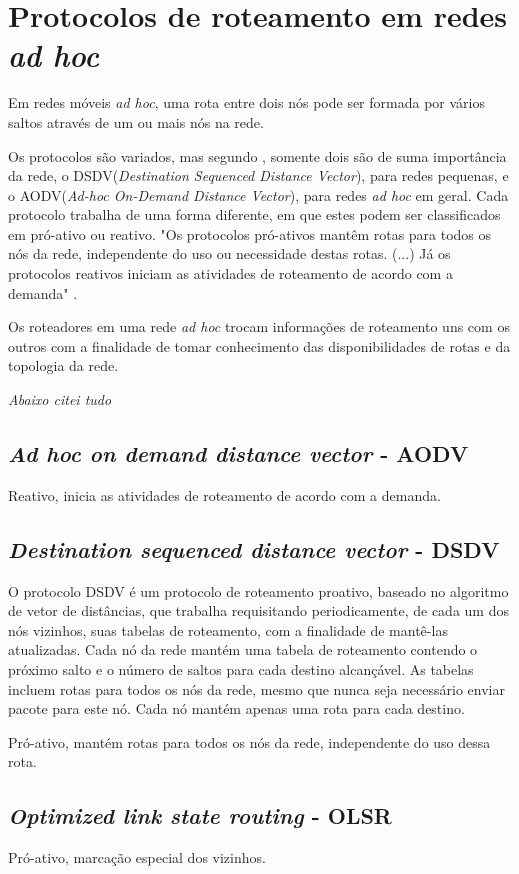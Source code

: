 \section{Protocolos de roteamento em redes \textit{ad hoc}}
Em redes m\'oveis \textit{ad hoc}, uma rota entre dois n\'os pode ser formada por v\'arios saltos atrav\'es de um ou mais n\'os na rede. 

Os protocolos s\~ao variados, mas segundo \cite{gorantala}, somente dois s\~ao de suma import\^ancia da rede, o DSDV(\textit{Destination Sequenced Distance Vector}), para redes pequenas, e o AODV(\textit{Ad-hoc On-Demand Distance Vector}), para redes \textit{ad hoc} em geral. Cada protocolo trabalha de uma forma diferente, em que estes podem ser classificados em pr\'o-ativo ou reativo. "Os protocolos pr\'o-ativos mant\^em rotas para todos os n\'os da rede, independente do uso ou necessidade destas rotas. (...) J\'a os protocolos reativos iniciam as atividades de roteamento de acordo com a demanda" \cite{pereira}.

Os roteadores em uma rede \textit{ad hoc} trocam informa\c{c}\~oes de roteamento uns com os outros com a finalidade de tomar conhecimento das disponibilidades de rotas e da topologia da rede.\cite{pereira}

\textit{Abaixo citei tudo \cite{gorantala}}

\subsection{\textit{Ad hoc on demand distance vector} - AODV}
Reativo, inicia as atividades de roteamento de acordo com a demanda.

\subsection{\textit{Destination sequenced distance vector} - DSDV}
O protocolo DSDV \'e um protocolo de roteamento proativo\cite{gorantala}, baseado no algoritmo de vetor de dist\^ancias, que trabalha requisitando periodicamente, de cada um dos n\'os vizinhos, suas tabelas de roteamento, com a finalidade de mant\^e-las atualizadas. Cada n\'o da rede mant\'em uma tabela de roteamento contendo o pr\'oximo salto e o n\'umero de saltos para cada destino alcan\c{c}\'avel. As tabelas incluem rotas para todos os n\'os da rede, mesmo que nunca seja necess\'ario enviar pacote para este n\'o. Cada n\'o mant\'em apenas uma rota para cada destino.



Pr\'o-ativo, mant\'em rotas para todos os n\'os da rede, independente do uso dessa rota.

\subsection{\textit{Optimized link state routing} - OLSR}
Pr\'o-ativo, marca\c{c}\~ao especial dos vizinhos.
